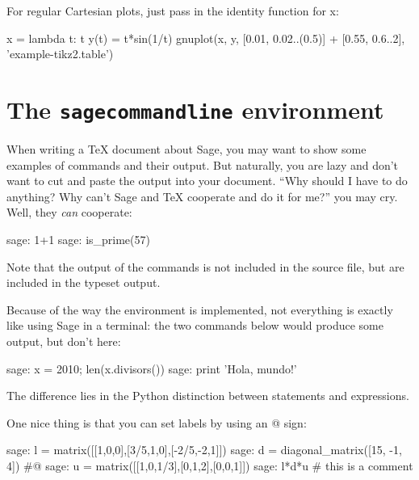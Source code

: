 \documentclass{article}
\begin{document}
For regular Cartesian plots, just pass in the identity function for x:

\begin{sageblock}
  x = lambda t: t
  y(t) = t*sin(1/t)
  gnuplot(x, y, [0.01, 0.02..(0.5)] + [0.55, 0.6..2], 'example-tikz2.table')
\end{sageblock}


\section{The \texttt{sagecommandline} environment}

When writing a \TeX{} document about Sage, you may want to show some
examples of commands and their output. But naturally, you are lazy and
don't want to cut and paste the output into your document. ``Why should
I have to do anything? Why can't Sage and \TeX{} cooperate and do it for
me?'' you may cry. Well, they \emph{can} cooperate:

\begin{sagecommandline}
  sage: 1+1
  sage: is_prime(57)
\end{sagecommandline}

Note that the output of the commands is not included in the source file,
but are included in the typeset output.

Because of the way the environment is implemented, not everything is
exactly like using Sage in a terminal: the two commands below would
produce some output, but don't here:

\begin{sagecommandline}
  sage: x = 2010; len(x.divisors())
  sage: print 'Hola, mundo!'
\end{sagecommandline}

The difference lies in the Python distinction between statements and
expressions.

One nice thing is that you can set labels by using an @ sign:

\begin{sagecommandline}
  sage: l = matrix([[1,0,0],[3/5,1,0],[-2/5,-2,1]])
  sage: d = diagonal_matrix([15, -1, 4]) #@\label{diagonal}
  sage: u = matrix([[1,0,1/3],[0,1,2],[0,0,1]])
  sage: l*d*u   # this is a comment
\end{sagecommandline}
\end{document}
